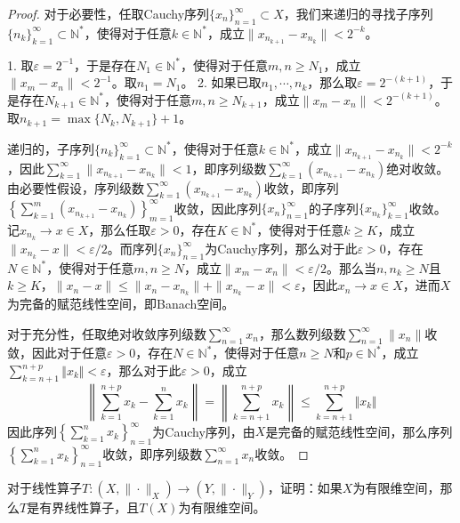 \documentclass[lang = cn, scheme = chinese, 10pt]{elegantbook}
\newcommand{\sub}{\subset}   %
\begin{document}
\begin{proof}
	对于必要性，任取Cauchy序列$\{x_n\}_{n=1}^{\infty}\sub X$，我们来递归的寻找子序列$\{ n_k \}_{k=1}^{\infty}\sub\mathbb{N}^*$，使得对于任意$k\in\mathbb{N}^*$，成立$\| x_{n_{k+1}}-x_{n_k} \|<2^{-k}$。
	
	1. 取$\varepsilon=2^{-1}$，于是存在$N_1\in\mathbb{N}^*$，使得对于任意$m,n\ge N_1$，成立$\|x_m-x_n\|<2^{-1}$。取$n_1=N_1$。
	2. 如果已取$n_1,\cdots,n_k$，那么取$\varepsilon=2^{-(k+1)}$，于是存在$N_{k+1}\in\mathbb{N}^*$，使得对于任意$m,n\ge N_{k+1}$，成立$\|x_m-x_n\|<2^{-(k+1)}$。取$n_{k+1}=\max\{ N_{k},N_{k+1} \}+1$。
	
	递归的，子序列$\{ n_k \}_{k=1}^{\infty}\sub\mathbb{N}^*$，使得对于任意$k\in\mathbb{N}^*$，成立$\| x_{n_{k+1}}-x_{n_k} \|<2^{-k}$，因此$\displaystyle\sum_{k=1}^{\infty}\|x_{n_{k+1}}-x_{n_k}\|<1$，即序列级数$\displaystyle\sum_{k=1}^{\infty}(x_{n_{k+1}}-x_{n_k})$绝对收敛。由必要性假设，序列级数$\displaystyle\sum_{k=1}^{\infty}(x_{n_{k+1}}-x_{n_k})$收敛，即序列$\displaystyle\left\{\sum_{k=1}^{m}(x_{n_{k+1}}-x_{n_k})\right\}_{m=1}^{\infty}$收敛，因此序列$\{x_n\}_{n=1}^{\infty}$的子序列$\{ x_{n_k} \}_{k=1}^{\infty}$收敛。记$x_{n_k}\to x\in X$，那么任取$\varepsilon>0$，存在$K\in\mathbb{N}^*$，使得对于任意$k\ge K$，成立$\| x_{n_k}-x\|<\varepsilon/2$。而序列$\{x_n\}_{n=1}^{\infty}$为Cauchy序列，那么对于此$\varepsilon>0$，存在$N\in\mathbb{N}^*$，使得对于任意$m,n\ge N$，成立$\|x_m-x_n\|<\varepsilon/2$。那么当$n,n_k\ge N$且$k\ge K$，$\| x_n-x \|\le \|x_n-x_{n_k}\|+\|x_{n_k}-x\|<\varepsilon $，因此$x_n\to x\in X$，进而$ X$为完备的赋范线性空间，即Banach空间。
	
	对于充分性，任取绝对收敛序列级数$\displaystyle\sum_{n=1}^{\infty}x_n$，那么数列级数$\displaystyle\sum_{n=1}^{\infty}\|x_n\|$收敛，因此对于任意$\varepsilon>0$，存在$N\in\mathbb{N}^*$，使得对于任意$n\ge N$和$p\in\mathbb{N}^*$，成立$\displaystyle\sum_{k=n+1}^{n+p} \Vert x_k \Vert<\varepsilon$，那么对于此$\varepsilon>0$，成立
	$$
	\left\|\sum_{k=1}^{n+p}x_k-\sum_{k=1}^{n}x_k\right\|
	=\left\|\sum_{k=n+1}^{n+p}x_k\right\|
	\le\sum_{k=n+1}^{n+p} \Vert x_k \Vert
	$$
	因此序列$\displaystyle\left\{\sum_{k=1}^{n}x_k\right\}_{n=1}^{\infty}$为Cauchy序列，由$X$是完备的赋范线性空间，那么序列$\displaystyle\left\{\sum_{k=1}^{n}x_k\right\}_{n=1}^{\infty}$收敛，即序列级数$\displaystyle\sum_{n=1}^{\infty}x_n$收敛。
\end{proof}

\begin{proposition}
	对于线性算子$T:(X,\|\cdot\|_X)\to (Y,\|\cdot\|_Y)$，证明：如果$X$为有限维空间，那么$T$是有界线性算子，且$T(X)$为有限维空间。
\end{proposition}
\end{document}
